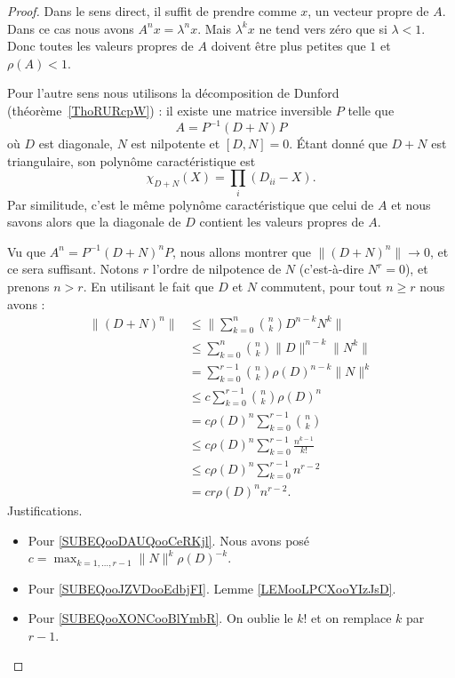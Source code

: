 \begin{proof}
	Dans le sens direct, il suffit de prendre comme \( x\), un vecteur propre de \( A\). Dans ce cas nous avons \( A^nx=\lambda^nx\). Mais \( \lambda^kx\) ne tend vers zéro que si \( \lambda<1\). Donc toutes les valeurs propres de \( A\) doivent être plus petites que \( 1\) et \( \rho(A)<1\).

	Pour l'autre sens nous utilisons la décomposition de Dunford (théorème~\ref{ThoRURcpW}) : il existe une matrice inversible \( P\) telle que
	\begin{equation}
		A=P^{-1}(D+N)P
	\end{equation}
	où \( D\) est diagonale, \( N\) est nilpotente et \( [D,N]=0\). Étant donné que \( D+N\) est triangulaire, son polynôme caractéristique est
	\begin{equation}
		\chi_{D+N}(X)=\prod_i( D_{ii}-X).
	\end{equation}
	Par similitude, c'est le même polynôme caractéristique que celui de \( A\) et nous savons alors que la diagonale de \( D\) contient les valeurs propres de \( A\).

	Vu que \( A^n=P^{-1}(D+N)^nP\), nous allons montrer que \( \| (D+N)^n \|\to 0\), et ce sera suffisant. Notons \( r\) l'ordre de nilpotence de \( N\) (c'est-à-dire \( N^r=0\)), et prenons \( n>r\). En utilisant le fait que \( D\) et \( N\) commutent, pour tout \( n\geq r\) nous avons :
	\begin{subequations}
		\begin{align}
			\| (D+N)^n \| & \leq \| \sum_{k=0}^n\binom{ n }{ k }D^{n-k}N^k \|                                   \\
			              & \leq \sum_{k=0}^n\binom{ n }{ k }\| D \|^{n-k}\| N^k \|                             \\
			              & =\sum_{k=0}^{r-1}\binom{ n }{ k }\rho(D)^{n-k}\| N \|^k                             \\
			              & \leq c\sum_{k=0}^{r-1}\binom{ n }{ k }\rho(D)^n \label{SUBEQooDAUQooCeRKjl}         \\
			              & =c\rho(D)^n\sum_{k=0}^{r-1}\binom{ n }{ k }                                         \\
			              & \leq c\rho(D)^n\sum_{k=0}^{r-1}\frac{ n^{k-1} }{ k! }   \label{SUBEQooJZVDooEdbjFI} \\
			              & \leq c\rho(D)^n\sum_{k=0}^{r-1}n^{r-2}  \label{SUBEQooXONCooBlYmbR}                 \\
			              & =cr\rho(D)^nn^{r-2}.
		\end{align}
	\end{subequations}
	Justifications.
	\begin{itemize}
		\item Pour \eqref{SUBEQooDAUQooCeRKjl}. Nous avons posé \( c=\max_{k=1,\ldots, r-1}\| N \|^k\rho(D)^{-k}\).
		\item Pour \eqref{SUBEQooJZVDooEdbjFI}. Lemme \ref{LEMooLPCXooYIzJsD}.
		\item Pour \eqref{SUBEQooXONCooBlYmbR}. On oublie le \( k!\) et on remplace \( k\) par \( r-1\).
	\end{itemize}


\end{proof}
